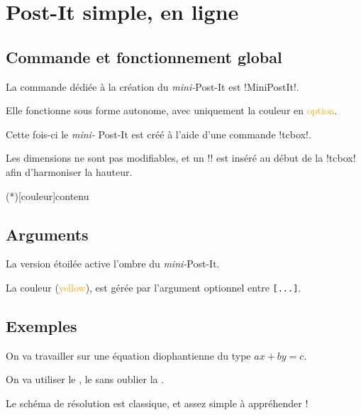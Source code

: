 \documentclass[french,a4paper,11pt]{article}
\newcommand\Cle[1]{{\small\sffamily\textlangle \textcolor{orange}{#1}\textrangle}}
\begin{document}
\pagebreak

\section{Post-It simple, en ligne}

\subsection{Commande et fonctionnement global}

\begin{cautionblock}
La commande dédiée à la création du \textit{mini-}Post-It est \motcletex!MiniPostIt!.

Elle fonctionne sous forme autonome, avec uniquement la couleur en \Cle{option}.

\smallskip

Cette fois-ci le \textit{mini-} Post-It est créé à l'aide d'une commande \motcletex!tcbox!.

\smallskip

Les dimensions ne sont pas modifiables, et un \motcletex!\vphantom! est inséré au début de la \motcletex!tcbox! afin d'harmoniser la hauteur.
\end{cautionblock}

\begin{DemoCode}
\MiniPostIt(*)[couleur]{contenu}
\end{DemoCode}

\subsection{Arguments}

\begin{noteblock}
La version étoilée active l'ombre du \textit{mini-}Post-It.

La couleur (\Cle{yellow}), est gérée par l'argument optionnel entre \texttt{[...]}.
\end{noteblock}

\subsection{Exemples}

\begin{DemoCode}[]
On va travailler sur une équation diophantienne du type $ax+by=c$.

On va utiliser le , le  sans oublier la .

Le schéma de résolution est classique, et assez simple à appréhender !
\end{DemoCode}
\end{document}
